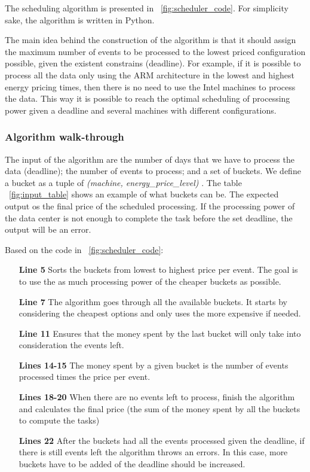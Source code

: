 The scheduling algorithm is presented in ~\ref{fig:scheduler_code}. For simplicity sake, the algorithm is written in Python.

The main idea behind the construction of the algorithm is that it should assign the maximum number of events to be processed to the lowest priced configuration possible, given the existent constrains (deadline). For example, if it is possible to process all the data only using the ARM architecture in the lowest and highest energy pricing times, then there is no need to use the Intel machines to process the data. This way it is possible to reach the optimal scheduling of processing power given a deadline and several machines with different configurations.

\subsubsection*{Algorithm walk-through}
The input of the algorithm are the number of days that we have to process the data (deadline); the number of events to process; and a set of buckets. We define a bucket as a tuple of \textit{ (machine, energy\_price\_level) }. The table ~\ref{fig:input_table} shows an example of what buckets can be.
The expected output os the final price of the scheduled processing. If the processing power of the data center is not enough to complete the task before the set deadline, the output will be an error.


\vspace{10mm}
Based on the code in ~\ref{fig:scheduler_code}: 
\begin{itemize}
  \item[\textbf{Line 5}] Sorts the buckets from lowest to highest price per event. The goal is to use the as much processing power of the cheaper buckets as possible.
  
  \item[\textbf{Line 7}] The algorithm goes through all the available buckets. It starts by considering the cheapest options and only uses the more expensive if needed.
  
  \item[\textbf{Line 11}] Ensures that the money spent by the last bucket will only take into consideration the events left. 
  
  \item[\textbf{Lines 14-15}] The money spent by a given bucket is the number of events processed times the price per event.
  
  \item[\textbf{Lines 18-20}] When there are no events left to process, finish the algorithm and calculates the final price (the sum of the money spent by all the buckets to compute the tasks)
  
  \item[\textbf{Lines 22}] After the buckets had all the events processed given the deadline, if there is still events left the algorithm throws an errors. In this case, more buckets have to be added of the deadline should be increased.

  \end{itemize}


